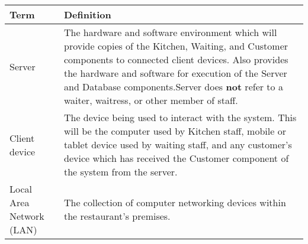 \documentclass[11pt, a4paper]{report}
\begin{document}
\begin{tabulary}{1.2\textwidth}{l L}
Term & Definition \\ \midrule

Server & The hardware and software environment which will provide copies of the Kitchen, Waiting, and Customer components to connected client devices. Also provides the hardware and software for execution of the Server and Database components.\newline Server does \textbf{not} refer to a waiter, waitress, or other member of staff. \\ \midrule
Client device & The device being used to interact with the system. This will be the computer used by Kitchen staff, mobile or tablet device used by waiting staff, and any customer's device which has received the Customer component of the system from the server.\\ \midrule
Local Area Network (LAN) & The collection of computer networking devices within the restaurant's premises.
\end{tabulary}

\nocite{*}
\printbibliography
\end{document}

